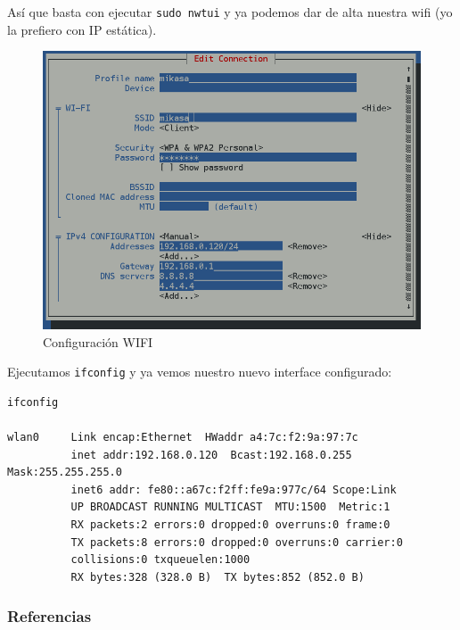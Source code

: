 \documentclass[12pt,spanish,]{article}
\begin{document}
Así que basta con ejecutar \texttt{sudo\ nwtui} y ya podemos dar de alta
nuestra wifi (yo la prefiero con IP estática).

\begin{figure}[htbp]
\centering
\includegraphics{src/img/OrangePiZero_tmtui.png}
\caption{Configuración WIFI}
\end{figure}

Ejecutamos \texttt{ifconfig} y ya vemos nuestro nuevo interface
configurado:

\begin{verbatim}
ifconfig

wlan0     Link encap:Ethernet  HWaddr a4:7c:f2:9a:97:7c
          inet addr:192.168.0.120  Bcast:192.168.0.255  Mask:255.255.255.0
          inet6 addr: fe80::a67c:f2ff:fe9a:977c/64 Scope:Link
          UP BROADCAST RUNNING MULTICAST  MTU:1500  Metric:1
          RX packets:2 errors:0 dropped:0 overruns:0 frame:0
          TX packets:8 errors:0 dropped:0 overruns:0 carrier:0
          collisions:0 txqueuelen:1000
          RX bytes:328 (328.0 B)  TX bytes:852 (852.0 B)
\end{verbatim}

\subsubsection{Referencias}\label{referencias}
\end{document}
